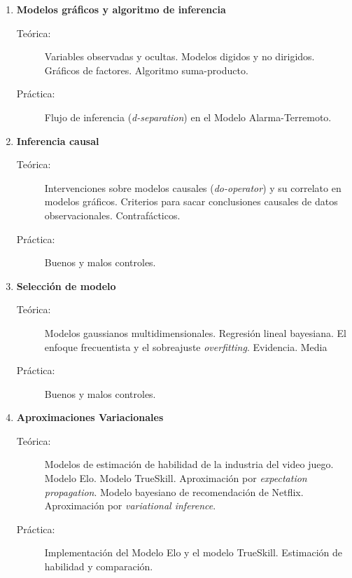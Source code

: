 \documentclass[10pt]{article}
\begin{document}
\begin{enumerate}

\vspace{0.1cm}
\item \textbf{Modelos gráficos y algoritmo de inferencia}
\vspace{-0.15cm}
\begin{description}
\item[Teórica:] Variables observadas y ocultas. Modelos digidos y no dirigidos. Gráficos de factores. Algoritmo suma-producto. 
\item[Práctica:] Flujo de inferencia (\emph{d-separation}) en el Modelo Alarma-Terremoto.
\end{description}


\vspace{0.1cm}
\item \textbf{Inferencia causal}
\vspace{-0.15cm}
\begin{description}
\item[Teórica:] Intervenciones sobre modelos causales (\emph{do-operator}) y su correlato en modelos gráficos. Criterios para sacar conclusiones causales de datos observacionales. Contrafácticos. 
\item[Práctica:] Buenos y malos controles.
\end{description}


\vspace{0.1cm}
\item \textbf{Selección de modelo}
\vspace{-0.15cm}
\begin{description}
\item[Teórica:] Modelos gaussianos multidimensionales. Regresión lineal bayesiana. El enfoque frecuentista y el sobreajuste \emph{overfitting}. Evidencia. Media 
\item[Práctica:] Buenos y malos controles.
\end{description}


\vspace{0.1cm}
\item \textbf{Aproximaciones Variacionales}
\vspace{-0.15cm}
\begin{description}
\item[Teórica:] Modelos de estimación de habilidad de la industria del video juego. Modelo Elo. Modelo TrueSkill. Aproximación por \emph{expectation propagation}. Modelo bayesiano de recomendación de Netflix. Aproximación por \emph{variational inference}.
\item[Práctica:] Implementación del Modelo Elo y el modelo TrueSkill. Estimación de habilidad y comparación.
\end{description}


\end{enumerate}
\end{document}
